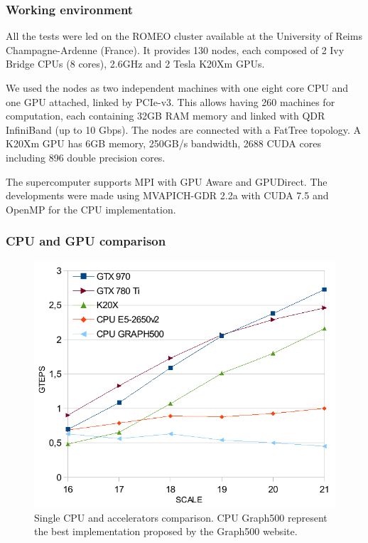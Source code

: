 \subsubsection{Working environment}

All the tests were led on the ROMEO cluster available at the University of Reims Champagne-Ardenne (France).
It provides 130 nodes, each composed of 2 Ivy Bridge CPUs (8 cores), 2.6GHz and 2 Tesla K20Xm GPUs.

We used the nodes as two independent machines with one eight core CPU and one GPU attached, linked by PCIe-v3.
This allows having 260 machines for computation, each containing 32GB RAM memory and linked with QDR InfiniBand (up to 10 Gbps).
The nodes are connected with a FatTree topology. 
A K20Xm GPU has 6GB memory, 250GB/s bandwidth, 2688 CUDA cores including 896 double precision cores.

The supercomputer supports MPI with GPU Aware and GPUDirect. 
The developments were made using MVAPICH-GDR 2.2a with CUDA 7.5 \cite{nvidia2008programming} and OpenMP for the CPU implementation.

\subsubsection{CPU and GPU comparison}

\begin{figure}[!t]
\centering
\includegraphics[width=.8\columnwidth]{figures/graph500/comparatif_GPU}
\caption[]{Single CPU and accelerators comparison. CPU Graph500 represent the best implementation proposed by the Graph500 website. }
\label{fig:single_cpu_accelerators}
\end{figure}

